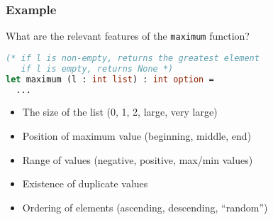 \documentclass[10pt,xcolor={dvipsnames}]{beamer}
\begin{document}

\begin{frame}[fragile]

\frametitle{Example}

What are the relevant features of the \texttt{maximum} function?

\begin{lstlisting}[language=Caml]
(* if l is non-empty, returns the greatest element 
   if l is empty, returns None *)
let maximum (l : int list) : int option =
  ...
\end{lstlisting}

\begin{itemize}
\pause\item The size of the list (0, 1, 2, large, very large) \\[0.5em]
\pause\item Position of maximum value (beginning, middle, end) \\[0.5em]
\pause\item Range of values (negative, positive, max/min values) \\[0.5em]
\pause\item Existence of duplicate values \\[0.5em]
\pause\item Ordering of elements (ascending, descending, ``random'')
\end{itemize}

\end{frame}

\end{document}

